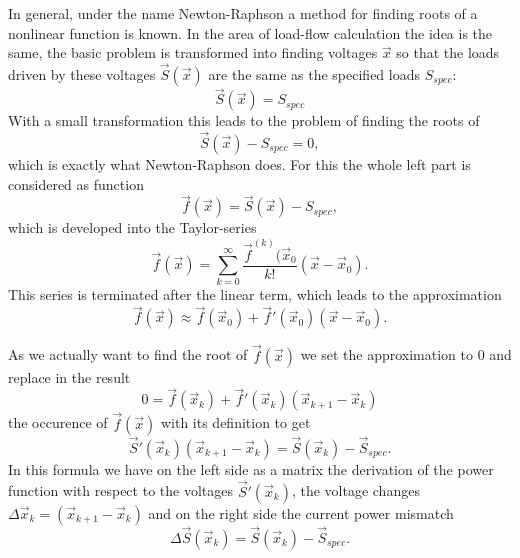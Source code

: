 In general, under the name Newton-Raphson a method for finding roots of a nonlinear function is known. In the area of load-flow calculation the idea is the same, the basic problem is transformed into finding voltages $\vec x$ so that the loads driven by these voltages $\vec S (\vec x)$ are the same as the specified loads $S_{spec}$:
\begin{equation}
	\vec S (\vec x) = S_{spec}
\end{equation}
With a small transformation this leads to the problem of finding the roots of
\begin{equation}
	\vec S (\vec x) - S_{spec} = 0,
\end{equation}
which is exactly what Newton-Raphson does. For this the whole left part is considered as function
\begin{equation}
	\vec f (\vec x) = \vec S (\vec x) - S_{spec},
\end{equation}
which is developed into the Taylor-series
\begin{equation}
	\vec f (\vec x) = \sum_{k = 0}^\infty \frac{\vec f^{(k)} (\vec x_0}{k!} \left( \vec x - \vec x_0 \right).
\end{equation}
This series is terminated after the linear term, which leads to the approximation
\begin{equation}
	\vec f (\vec x) \approx \vec f (\vec x_0) + \vec f' (\vec x_0) \left( \vec x - \vec x_0 \right).
\end{equation}

As we actually want to find the root of $\vec f (\vec x)$ we set the approximation to 0 and replace in the result
\begin{equation}
	0 = \vec f (\vec x_k) + \vec f' (\vec x_k) \left( \vec x_{k + 1} - \vec x_k \right)
\end{equation}
the occurence of $\vec f (\vec x)$ with its definition to get
\begin{equation}
	\vec S' (\vec x_k) \left( \vec x_{k + 1} - \vec x_k \right) = \vec S (\vec x_k) - \vec S_{spec}.
	\label{eq:newton_raphson_equation_system}
\end{equation}
In this formula we have on the left side as a matrix the derivation of the power function with respect to the voltages $\vec S' (\vec x_k)$, the voltage changes $\Delta \vec x_k = \left( \vec x_{k + 1} - \vec x_k \right)$ and on the right side the current power mismatch 
\begin{equation}
	\Delta \vec S (\vec x_k) = \vec S (\vec x_k) - \vec S_{spec}.
	\label{eq:power_mismatch}
\end{equation}

